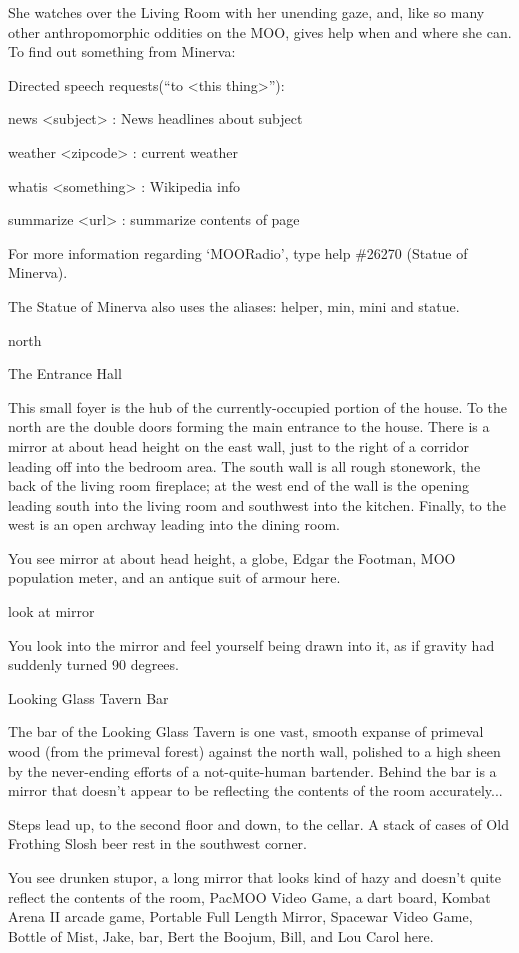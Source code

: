 \documentclass[10pt,twoside,openany]{memoir}
\begin{document}
{She watches over the Living Room with her unending gaze, and, like so many other anthropomorphic oddities on the MOO, gives help when and where she can.  To find out something from Minerva:

Directed speech requests(``to <this thing>''):

news <subject> : News headlines about subject

weather <zipcode> : current weather

whatis <something> : Wikipedia info

summarize <url> : summarize contents of page

For more information regarding `MOORadio', type help \#26270  (Statue of Minerva).

The Statue of Minerva also uses the aliases: helper, min, mini and statue.

north

The Entrance Hall

This small foyer is the hub of the currently-occupied portion of the house.  To the north are the double doors forming the main entrance to the house.  There is a mirror at about head height on the east wall, just to the right of a corridor leading off into the bedroom area.  The south wall is all rough stonework, the back of the living room fireplace; at the west end of the wall is the opening leading south into the living room and southwest into the kitchen.  Finally, to the west is an open archway leading into the dining room.

You see mirror at about head height, a globe, Edgar the Footman, MOO population meter, and an antique suit of armour here.

look at mirror

You look into the mirror and feel yourself being drawn into it, as if gravity had suddenly turned 90 degrees.

Looking Glass Tavern Bar

The bar of the Looking Glass Tavern is one vast, smooth expanse of primeval wood (from the primeval forest) against the north wall, polished to a high sheen by the never-ending efforts of a not-quite-human bartender.  Behind the bar is a mirror that doesn't appear to be reflecting the contents of the room accurately...

Steps lead up, to the second floor and down, to the cellar.  A stack of cases of Old Frothing Slosh beer rest in the southwest corner.

You see drunken stupor, a long mirror that looks kind of hazy and doesn't quite reflect the contents of the room, PacMOO Video Game, a dart board, Kombat Arena II arcade game, Portable Full Length Mirror, Spacewar Video Game, Bottle of Mist, Jake, bar, Bert the Boojum, Bill, and Lou Carol here.

}
\end{document}

